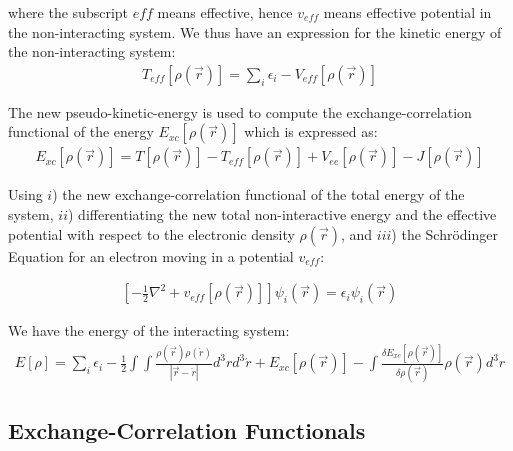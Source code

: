 \noindent where the subscript $eff$ means
effective, hence $v_{eff}$ means effective potential in the non-interacting system.
We thus have an expression for the kinetic energy of the
non-interacting system:
\begin{align}
T_{eff}[\rho(\vec{r})] = \sum_{i}\epsilon_{i} - V_{eff}[\rho(\vec{r})]
\end{align}

The new pseudo-kinetic-energy is used to compute the exchange-correlation functional of the energy
$E_{xc}[\rho(\vec{r})]$ which is expressed as:
\begin{align}
E_{xc}[\rho(\vec{r})] = T[\rho(\vec{r})] - T_{eff}[\rho(\vec{r})] +
V_{ee}[\rho(\vec{r})] - J[\rho(\vec{r})] 
\end{align}

Using $i$) the new exchange-correlation functional of the total energy of the system,
$ii$) differentiating the new total non-interactive energy and the effective
potential with respect to the electronic density $\rho(\vec{r})$, and $iii$)
the Schrödinger Equation for an electron moving in a
potential $v_{eff}$:

\begin{align}
\left[-\frac12\nabla^2 + v_{eff}[\rho(\vec{r})]\right]\psi_{i}(\vec{r})=\epsilon_{i}\psi_{i}(\vec{r})
\end{align}

\vspace{5mm}
We have the energy of the interacting system:
\begin{align}
E[\rho] = \sum_i\epsilon_i -\frac12\int\int\frac{\rho(\vec{r})\rho(\acute{r})}
{|\vec{r}-\acute{r}|}d^3r d^3\acute{r}+ E_{xc}[\rho(\vec{r})] -
\int\frac{\delta E_{xc}[\rho(\vec{r})]}{\delta\rho(\vec{r})}\rho(\vec{r})d^3r 
\end{align}

\subsection{Exchange-Correlation Functionals}

